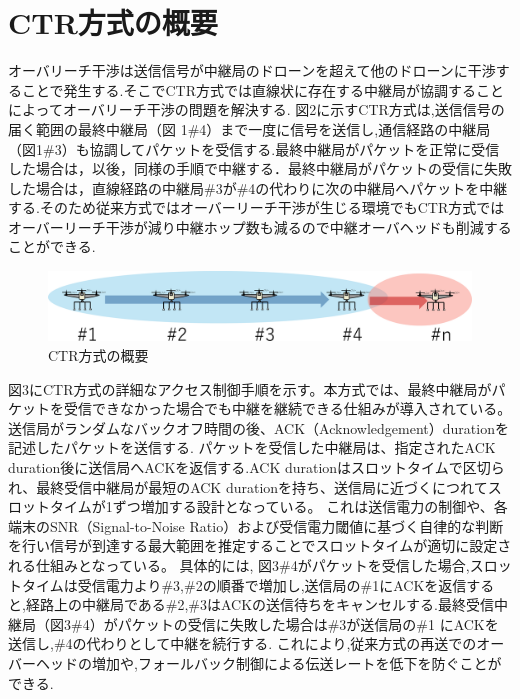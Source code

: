 \documentclass[a4paper,10.5pt]{ltjsarticle}
\begin{document}
\clearpage
\section{CTR方式の概要}
オーバリーチ干渉は送信信号が中継局のドローンを超えて他のドローンに干渉することで発生する.そこでCTR方式では直線状に存在する中継局が協調することによってオーバリーチ干渉の問題を解決する.
図2に示すCTR方式は,送信信号の届く範囲の最終中継局（図 1\#4）まで一度に信号を送信し,通信経路の中継局（図1\#3）も協調してパケットを受信する.最終中継局がパケットを正常に受信した場合は，以後，同様の手順で中継する．最終中継局がパケットの受信に失敗した場合は，直線経路の中継局\#3が\#4の代わりに次の中継局へパケットを中継する.そのため従来方式ではオーバーリーチ干渉が生じる環境でもCTR方式ではオーバーリーチ干渉が減り中継ホップ数も減るので中継オーバヘッドも削減することができる.

\begin{figure}[H]
  \centering
  \includegraphics[width=\linewidth]{CTR_topology.pdf} %
  \caption{CTR方式の概要}
  \label{fig:CTR方式のトポロジー} %
\end{figure}

図3にCTR方式の詳細なアクセス制御手順を示す。本方式では、最終中継局がパケットを受信できなかった場合でも中継を継続できる仕組みが導入されている。送信局がランダムなバックオフ時間の後、ACK（Acknowledgement）durationを記述したパケットを送信する.
パケットを受信した中継局は、指定されたACK duration後に送信局へACKを返信する.ACK durationはスロットタイムで区切られ、最終受信中継局が最短のACK durationを持ち、送信局に近づくにつれてスロットタイムが1ずつ増加する設計となっている。
これは送信電力の制御や、各端末のSNR（Signal-to-Noise Ratio）および受信電力閾値に基づく自律的な判断を行い信号が到達する最大範囲を推定することでスロットタイムが適切に設定される仕組みとなっている。
具体的には, 図3\#4がパケットを受信した場合,スロットタイムは受信電力より\#3,\#2の順番で増加し,送信局の\#1にACKを返信すると,経路上の中継局である\#2,\#3はACKの送信待ちをキャンセルする.最終受信中継局（図3\#4）がパケットの受信に失敗した場合は\#3が送信局の\#1 にACKを送信し,\#4の代わりとして中継を続行する.
これにより,従来方式の再送でのオーバーヘッドの増加や,フォールバック制御による伝送レートを低下を防ぐことができる.
\end{document}
